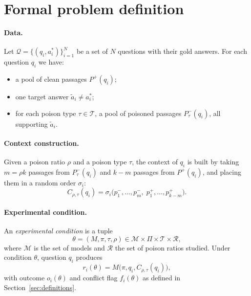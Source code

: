 \documentclass[11pt,a4paper]{report}
\begin{document}
\section{Formal problem definition}\label{sec:formal}

\paragraph{Data.}
Let $\mathcal{Q} = \{(q_i, a^{*}_i)\}_{i=1}^{N}$ be a set of $N$ questions
with their gold answers. For each question $q_i$ we have:
\begin{itemize}[nosep]
  \item a pool of clean passages $P^{+}(q_i)$;
  \item one target answer $\tilde{a}_i \neq a^{*}_i$;
  \item for each poison type $\tau \in \mathcal{T}$, a pool of poisoned
        passages $P^{-}_{\tau}(q_i)$, all supporting $\tilde{a}_i$.
\end{itemize}

\paragraph{Context construction.}
Given a poison ratio $\rho$ and a poison type $\tau$, the context of $q_i$
is built by taking $m = \rho k$ passages from $P^{-}_{\tau}(q_i)$ and
$k - m$ passages from $P^{+}(q_i)$, and placing them in a random order
$\sigma_i$:
\[
  C_{\rho,\tau}(q_i) = \sigma_i\big(p^{-}_{1}, \dots, p^{-}_{m},\;
                                   p^{+}_{1}, \dots, p^{+}_{k-m}\big).
\]

\paragraph{Experimental condition.}
An \emph{experimental condition} is a tuple
\[
  \theta = (M, \pi, \tau, \rho) \in
  \mathcal{M} \times \Pi \times \mathcal{T} \times \mathcal{R},
\]
where $\mathcal{M}$ is the set of models and $\mathcal{R}$ the set of
poison ratios studied. Under condition $\theta$, question $q_i$ produces
\[
  r_i(\theta) = M\big(\pi, q_i, C_{\rho,\tau}(q_i)\big),
\]
with outcome $o_i(\theta)$ and conflict flag $f_i(\theta)$ as defined in
Section~\ref{sec:definitions}.
\end{document}
